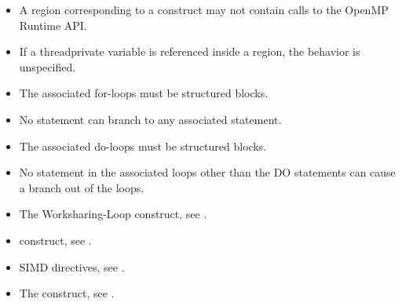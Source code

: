 \begin{itemize}
\item A  region corresponding to a  construct may not
  contain calls to the OpenMP Runtime API.

\item If a threadprivate variable is referenced inside a  region, the behavior is unspecified.

\end{itemize}

\begin{ccppspecific}
\begin{itemize}

  \item The associated for-loops must be structured blocks.

  \item No statement can branch to any associated  statement.

\end{itemize}

\end{ccppspecific}

\begin{fortranspecific}
\begin{itemize}

  \item The associated do-loops must be structured blocks.

  \item No statement in the associated loops other than the DO statements can cause
    a branch out of the loops.


\end{itemize}
\end{fortranspecific}

\crossreferences
\begin{itemize}
  \item The Worksharing-Loop construct, see .

  \item {} construct, see .

  \item SIMD directives, see .

  \item The  construct, see .

\end{itemize}



